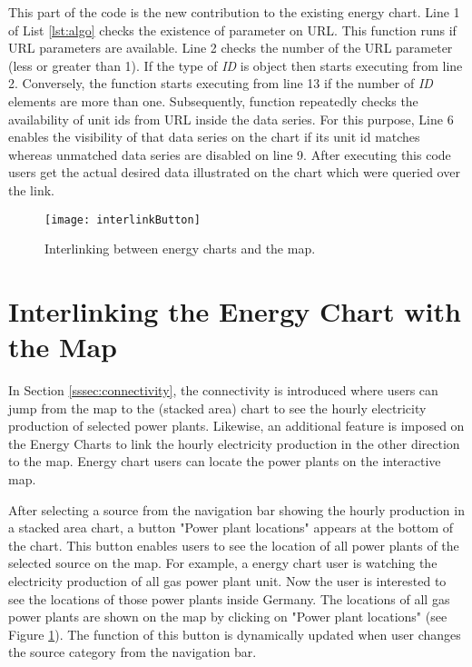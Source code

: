This part of the code is the new contribution to the existing energy chart. Line 1 of List \ref{lst:algo} checks the existence of parameter on URL. This function runs if URL parameters are available. Line 2 checks the number of the URL parameter (less or greater than 1). If the type of \textit{ID} is object then starts executing from line 2. Conversely, the function starts executing from line 13 if the number of \textit{ID} elements are more than one. Subsequently, function repeatedly checks the availability of unit ids from URL inside the data series. For this purpose, Line 6 enables the visibility of that data series on the chart if its unit id matches whereas unmatched data series are disabled on line 9. After executing this code users get the actual desired data illustrated on the chart which were queried over the link.

\begin{figure} [h]
\centering
\texttt{[image: interlinkButton]}
\caption{Interlinking between energy charts and the map.}
\label{fig:interlink}
\end{figure}

\section{Interlinking the Energy Chart with the Map}

In Section \ref{sssec:connectivity}, the connectivity is introduced where users can jump from the map to the (stacked area) chart to see the hourly electricity production of selected power plants. Likewise, an additional feature is imposed on the Energy Charts to link the hourly electricity production in the other direction to the map. Energy chart users can locate the power plants on the interactive map.

After selecting a source from the navigation bar showing the hourly production in a stacked area chart, a button "Power plant locations" appears at the bottom of the chart. This button enables users to see the location of all power plants of the selected source on the map. For example, a energy chart user is watching the electricity production of all gas power plant unit. Now the user is interested to see the locations of those power plants inside Germany. The locations of all gas power plants are shown on the map by clicking on "Power plant locations" (see Figure \ref{fig:interlink}). The function of this button is dynamically updated when user changes the source category from the navigation bar. 

